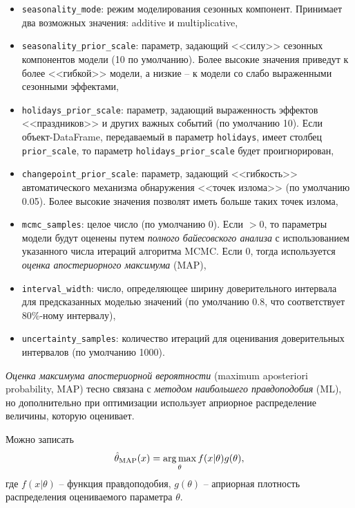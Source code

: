 \documentclass[%
	11pt,
	a4paper,
	utf8,
		]{article}
\begin{document}
\begin{itemize}
	\item \texttt{seasonality\_mode}: режим моделирования сезонных компонент. Принимает два возможных значения: additive и multiplicative,
	
	\item \texttt{seasonality\_prior\_scale}: параметр, задающий <<силу>> сезонных компонентов модели (10 по умолчанию). Более высокие значения приведут к более <<гибкой>> модели, а низкие -- к модели со слабо выраженными сезонными эффектами,
	
	\item \texttt{holidays\_prior\_scale}: параметр, задающий выраженность эффектов <<праздников>> и других важных событий (по умолчанию 10). Если объект-DataFrame, передаваемый в параметр \texttt{holidays}, имеет столбец \texttt{prior\_scale}, то параметр \texttt{holidays\_prior\_scale} будет проигнорирован,
	
	\item \texttt{changepoint\_prior\_scale}: параметр, задающий <<гибкость>> автоматического механизма обнаружения <<точек излома>> (по умолчанию 0.05). Более высокие значения позволят иметь больше таких точек излома,
	
	\item \texttt{mcmc\_samples}: целое число (по умолчанию 0). Если $ > 0 $, то параметры модели будут оценены путем \emph{полного байесовского анализа} с использованием указанного числа итераций алгоритма MCMC. Если 0, тогда используется \emph{оценка апостериорного максимума} (MAP),
	
	\item \texttt{interval\_width}: число, определяющее ширину доверительного интервала для предсказанных моделью значений (по умолчанию 0.8, что соответствует 80\%-ному интервалу),
	
	\item \texttt{uncertainty\_samples}: количество итераций для оценивания доверительных интервалов (по умолчанию 1000).
\end{itemize}

\emph{Оценка максимума апостериорной вероятности} (maximum aposteriori probability, MAP) тесно связана с \emph{методом наибольшего правдоподобия} (ML), но дополнительно при оптимизации использует априорное распределение величины, которую оценивает.

Можно записать
\begin{align*}
	\hat{\theta}_{\rm MAP}(x) = \underset{\theta}{\operatorname{arg\,max}}\, f(x | \theta)g(\theta),
\end{align*}
где $ f(x | \theta) $ -- функция правдоподобия, $ g(\theta) $ -- априорная плотность распределения оцениваемого параметра $ \theta $.
\end{document}
